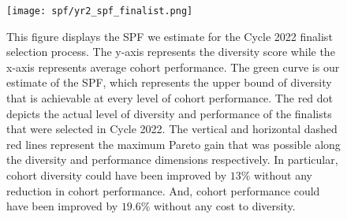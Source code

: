 \begin{figure}[!hbtp]
    \centering
    \caption{This figure displays the SPF we estimate for the Cycle 2022 finalist selection process. The y-axis represents the diversity score while the x-axis represents average cohort performance. The green curve is our estimate of the SPF, which represents the upper bound of diversity that is achievable at every level of cohort performance. The red dot depicts the actual level of diversity and performance of the finalists that were selected in Cycle 2022. The vertical and horizontal dashed red lines represent the maximum Pareto gain that was possible along the diversity and performance dimensions respectively. In particular, cohort diversity could have been improved by $13\%$ without any reduction in cohort performance. And, cohort performance could have been improved by $19.6\%$ without any cost to diversity.}
    \label{fig:spf_2022_full}
    \texttt{[image: spf/yr2\_spf\_finalist.png]} 
\end{figure}



    
    
    
